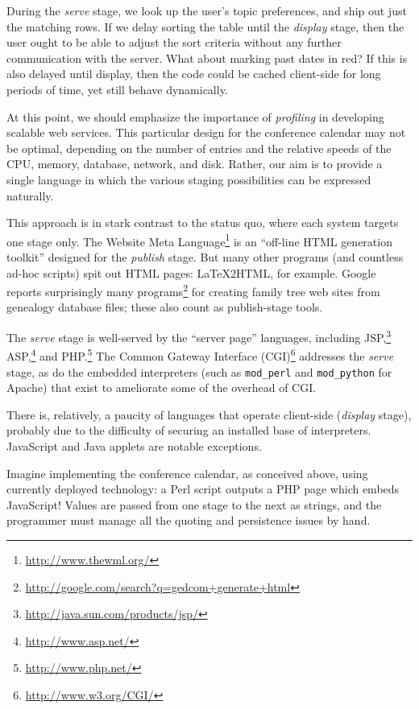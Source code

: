 \documentclass{elsart}
\begin{document}
During the \emph{serve} stage, we look up the user's topic
preferences, and ship out just the matching rows.  If we delay
sorting the table until the \emph{display} stage, then the user
ought to be able to adjust the sort criteria without any
further communication with the server.  What about marking
past dates in red?  If this is also delayed until display,
then the code could be cached client-side for long periods
of time, yet still behave dynamically.

At this point, we should emphasize the importance of \emph{profiling}
in developing scalable web services.  This particular design for the
conference calendar may not be optimal, depending on the number of
entries and the relative speeds of the CPU, memory, database, network,
and disk.  Rather, our aim is to provide a single language in which
the various staging possibilities can be expressed naturally.

This approach is in stark contrast to the status quo, where each
system targets one stage only.  The Website Meta
Language\footnote{\url{http://www.thewml.org/}} is an ``off-line HTML
generation toolkit'' designed for the \emph{publish} stage.  But many
other programs (and countless ad-hoc scripts) spit out HTML pages:
\LaTeX2HTML, for example.  Google reports surprisingly many
programs\footnote{\url{http://google.com/search?q=gedcom+generate+html}}
for creating family tree web sites from genealogy database files;
these also count as publish-stage tools.

The \emph{serve} stage is well-served by the ``server page''
languages, including
JSP,\footnote{\url{http://java.sun.com/products/jsp/}}
ASP,\footnote{\url{http://www.asp.net/}} and
PHP.\footnote{\url{http://www.php.net/}} The Common Gateway Interface
(CGI)\footnote{\url{http://www.w3.org/CGI/}} addresses the
\emph{serve} stage, as do the embedded interpreters (such as
\texttt{mod\_perl} and \texttt{mod\_python} for Apache) that exist to
ameliorate some of the overhead of CGI.

There is, relatively, a paucity of languages that operate client-side
(\emph{display} stage), probably due to the difficulty of securing an
installed base of interpreters.  JavaScript and Java applets are
notable exceptions.  

Imagine implementing the conference calendar, as conceived
above, using currently deployed technology: a Perl script
outputs a PHP page which embeds JavaScript!  Values are
passed from one stage to the next as strings, and the
programmer must manage all the quoting and persistence
issues by hand.
\end{document}
